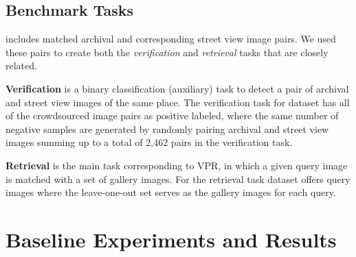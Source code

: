 \documentclass[a4paper,conference]{IEEEtran}
\begin{document}
\subsection{Benchmark Tasks}
\label{sub:tasks}
\amstertime  includes  matched archival and corresponding street view image pairs. We used these pairs to create both the {\textit{verification}} and {\textit{retrieval}} tasks that are closely related.

\textbf{Verification} is a binary classification (auxiliary) task to detect a pair of archival and street view images of the same place.  The verification task for \amstertime dataset has all of the crowdsourced image pairs as positive labeled, where the same number of negative samples are generated by randomly pairing archival and street view images summing up to a total of 2,462 pairs in the verification task.

\textbf{Retrieval} is the main task corresponding to VPR, in which a given query image is matched with a set of gallery images. For the retrieval task \amstertime dataset offers  query images where the leave-one-out set serves as the gallery images for each query.   \section{Baseline Experiments and Results}
\label{sec:experiments}
\end{document}

